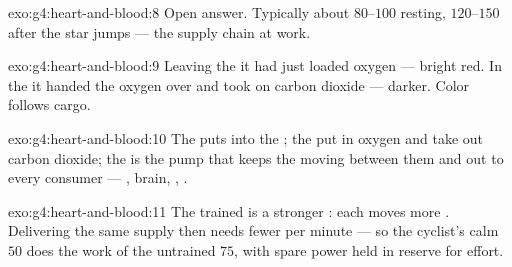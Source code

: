 \begin{solution}{exo:g4:heart-and-blood:8}
Open answer. Typically about $80$--$100$ resting, $120$--$150$
after the star jumps --- the supply chain at work.
\end{solution}

\begin{solution}{exo:g4:heart-and-blood:9}
Leaving the  it had just loaded oxygen --- bright red.
In the  it handed the oxygen over and took on carbon
dioxide --- darker. Color follows cargo.
\end{solution}

\begin{solution}{exo:g4:heart-and-blood:10}
The  puts  into the ; the 
put in oxygen and take out carbon dioxide; the  is the
pump that keeps the  moving between them and out to
every consumer --- , brain, , .
\end{solution}

\begin{solution}{exo:g4:heart-and-blood:11}
The trained  is a stronger : each  moves more
. Delivering the same supply then needs fewer  per
minute --- so the cyclist's calm $50$ does the work of the
untrained $75$, with spare power held in reserve for effort.
\end{solution}
